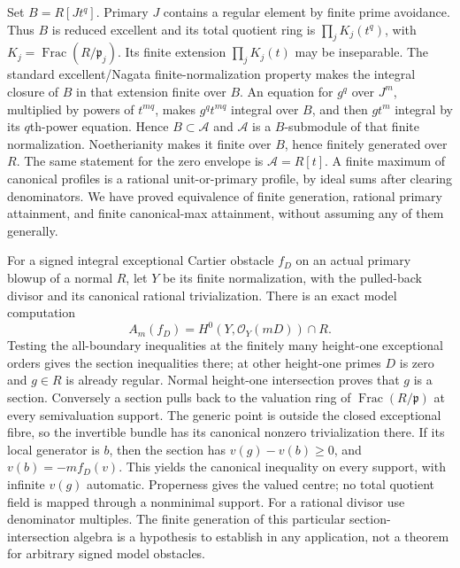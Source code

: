 \documentclass[11pt]{article}
\begin{document}
Set $B=R[Jt^q]$. Primary $J$ contains a regular element by finite prime avoidance. Thus $B$ is reduced excellent and its total quotient ring is $\prod_j K_j(t^q)$, with $K_j=\operatorname{Frac}(R/\mathfrak p_j)$. Its finite extension $\prod_j K_j(t)$ may be inseparable. The standard excellent/Nagata finite-normalization property makes the integral closure of $B$ in that extension finite over $B$. An equation for $g^q$ over $J^m$, multiplied by powers of $t^{mq}$, makes $g^qt^{mq}$ integral over $B$, and then $gt^m$ integral by its $q$th-power equation. Hence $B\subset\mathcal A$ and $\mathcal A$ is a $B$-submodule of that finite normalization. Noetherianity makes it finite over $B$, hence finitely generated over $R$. The same statement for the zero envelope is $\mathcal A=R[t]$. A finite maximum of canonical profiles is a rational unit-or-primary profile, by ideal sums after clearing denominators. We have proved equivalence of finite generation, rational primary attainment, and finite canonical-max attainment, without assuming any of them generally.

For a signed integral exceptional Cartier obstacle $f_D$ on an actual primary blowup of a normal $R$, let $Y$ be its finite normalization, with the pulled-back divisor and its canonical rational trivialization. There is an exact model computation
\[
 A_m(f_D)=H^0(Y,\mathcal O_Y(mD))\cap R. \tag{6a}
\]
Testing the all-boundary inequalities at the finitely many height-one exceptional orders gives the section inequalities there; at other height-one primes $D$ is zero and $g\in R$ is already regular. Normal height-one intersection proves that $g$ is a section. Conversely a section pulls back to the valuation ring of $\operatorname{Frac}(R/\mathfrak p)$ at every semivaluation support. The generic point is outside the closed exceptional fibre, so the invertible bundle has its canonical nonzero trivialization there. If its local generator is $b$, then the section has $v(g)-v(b)\ge0$, and $v(b)=-mf_D(v)$. This yields the canonical inequality on every support, with infinite $v(g)$ automatic. Properness gives the valued centre; no total quotient field is mapped through a nonminimal support. For a rational divisor use denominator multiples. The finite generation of this particular section-intersection algebra is a hypothesis to establish in any application, not a theorem for arbitrary signed model obstacles.
\end{document}
